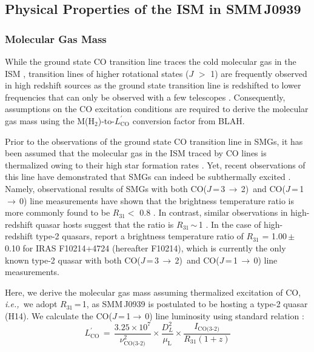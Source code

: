\documentclass[twocolumn,apj,numberedappendix]{emulateapj}
\newcommand{\rarr}{$\rightarrow$}
\newcommand{\CO}{\mbox{CO($J$\,=\,3\,$\rightarrow$\,2) }}
\newcommand{\eg}{{\sl e.g.,~}}
\newcommand{\ie}{{\sl i.e.,~}}
\begin{document}
\subsection{Physical Properties of the ISM in SMM\,J0939}
\subsubsection{Molecular Gas Mass}
While the ground state CO transition line traces the cold molecular gas in the ISM
\citep*[\eg][]{Wilson70a,Downes98a}, transition lines of higher rotational states ($J$ $>$ 1) are frequently observed in high redshift sources as the
 ground state transition line is redshifted to lower frequencies that can only be observed with a few telescopes
 \citep{Carilli13a}. Consequently, assumptions on the CO excitation conditions are required to derive the molecular gas mass using the M(H$_\textrm{2}$)-to-$L^{\prime}_\textrm{CO}$
 conversion factor from BLAH. \par
Prior to the observations of the ground state CO transition line in SMGs, it has been assumed that the molecular gas in the
  ISM traced by CO lines is thermalized owing to their high star formation rates \citep[\eg][]{Greve05a, Coppin08a}.
   Yet, recent observations of this line have demonstrated that SMGs can indeed be subthermally excited
   \citep{Harris10a,Riechers11c,Riechers11d,Ivison11a}. Namely, observational results of SMGs with both \CO and CO($J$\,=\,1\,\rarr\,0) line measurements have shown that the
   brightness temperature ratio is more commonly found to be $R_\textrm{31}<$ 0.8 \citep
   {Harris10a,Carilli10a,Swinbank2010a,Ivison10d,Ivison11a,Riechers11d}. In contrast, similar observations in high-redshift quasar hosts suggest that the ratio
   is $R_\textrm{31}$\,$\sim$\,1 \citep{Riechers06a, Riechers11a}. In the case of high-redshift type-2 quasars, \citet{Riechers11a} report a brightness temperature ratio of $R_\textrm{31}$ = 1.00\,$\pm$\,0.10 for IRAS F10214+4724 (hereafter F10214), which is currently the only known type-2 quasar with both \CO and CO($J$\,=\,1\,\rarr\,0) line measurements. \par
Here, we derive the molecular gas mass
assuming thermalized excitation of CO,
\ie we adopt $R_\textrm{31}$\,=\,1, as SMM\,J0939 is
postulated to be hosting a type-2 quasar (H14).
We calculate the CO($J$\,=\,1\rarr\,0) line luminosity using standard relation
\citep[\eg][]{Solomon05a,Carilli13a}:
\begin{equation}
L^{\prime}_\textrm{CO}\,=\,\frac{3.25\times10^7}{\nu_\textrm{CO(3-2)}^2}\times \frac{D_L^2}{\mu_\textrm{L}} \times
\frac{I_\textrm{CO(3-2)}} {R_\textrm{31} (1 + z)}
\end{equation}
\end{document}
